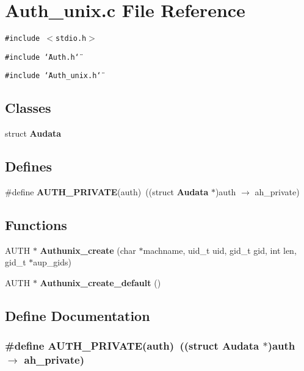 \section{Auth\_\-unix.c File Reference}
\label{Auth__unix_8c}
{\tt \#include $<$stdio.h$>$}\par
{\tt \#include \char`\"{}Auth.h\char`\"{}}\par
{\tt \#include \char`\"{}Auth\_\-unix.h\char`\"{}}\par
\subsection*{Classes}
\begin{CompactItemize}
\item 
struct {\bf Audata}
\end{CompactItemize}
\subsection*{Defines}
\begin{CompactItemize}
\item 
\#define {\bf AUTH\_\-PRIVATE}(auth)\ ((struct {\bf Audata} $\ast$)auth $\rightarrow$ ah\_\-private)
\end{CompactItemize}
\subsection*{Functions}
\begin{CompactItemize}
\item 
AUTH $\ast$ {\bf Authunix\_\-create} (char $\ast$machname, uid\_\-t uid, gid\_\-t gid, int len, gid\_\-t $\ast$aup\_\-gids)
\item 
AUTH $\ast$ {\bf Authunix\_\-create\_\-default} ()
\end{CompactItemize}


\subsection{Define Documentation}
\subsubsection{\setlength{\rightskip}{0pt plus 5cm}\#define AUTH\_\-PRIVATE(auth)\ ((struct {\bf Audata} $\ast$)auth $\rightarrow$ ah\_\-private)}\label{Auth__unix_8c_a0}




